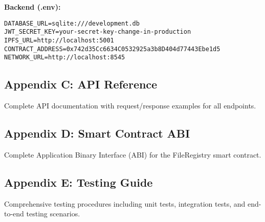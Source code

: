 \documentclass[11pt,a4paper]{article}
\begin{document}
\textbf{Backend (.env):}
\begin{lstlisting}
DATABASE_URL=sqlite:///development.db
JWT_SECRET_KEY=your-secret-key-change-in-production
IPFS_URL=http://localhost:5001
CONTRACT_ADDRESS=0x742d35Cc6634C0532925a3b8D404d77443Ebe1d5
NETWORK_URL=http://localhost:8545
\end{lstlisting}

\subsection{Appendix C: API Reference}

Complete API documentation with request/response examples for all endpoints.

\subsection{Appendix D: Smart Contract ABI}

Complete Application Binary Interface (ABI) for the FileRegistry smart contract.

\subsection{Appendix E: Testing Guide}

Comprehensive testing procedures including unit tests, integration tests, and end-to-end testing scenarios.
\end{document}
